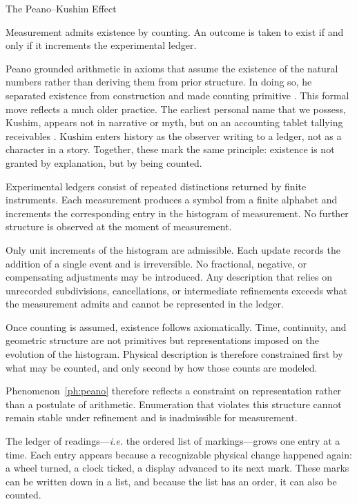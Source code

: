 \begin{phenom}{The Peano--Kushim Effect~\cite{peano1889,schmandtbesserat1992}}
\label{ph:peano}

\PhStatement
Measurement admits existence by counting.  An outcome is taken to exist if and
only if it increments the experimental ledger.

\PhOrigin
Peano grounded arithmetic in axioms that assume the existence of the natural
numbers rather than deriving them from prior structure. In doing so, he
separated existence from construction and made counting primitive
\cite{peano1889}. This formal move reflects a much older practice. The earliest
personal name that we possess, Kushim, appears not
in narrative or myth, but on an accounting tablet tallying receivables
\cite{schmandtbesserat1992}. Kushim enters history as the observer writing
to a ledger, not as a character in a story. Together, these mark the same
principle: existence is not granted by explanation, but by being counted.

\PhObservation
Experimental ledgers consist of repeated distinctions returned by finite
instruments.  Each  measurement produces a symbol from a finite
alphabet and increments the corresponding entry in the histogram of measurement.  
No further structure is observed at the moment of measurement.

\PhConstraint
Only unit increments of the histogram are admissible. Each update records the
addition of a single event and is irreversible. No fractional, negative, or
compensating adjustments may be introduced. Any description that relies on
unrecorded subdivisions, cancellations, or intermediate refinements exceeds
what the measurement admits and cannot be represented in the ledger.

\PhConsequence
Once counting is assumed, existence follows axiomatically.  Time, continuity,
and geometric structure are not primitives but representations imposed on the
evolution of the histogram.  Physical description is therefore constrained
first by what may be counted, and only second by how those counts are modeled.
\end{phenom}

Phenomenon~\ref{ph:peano} therefore reflects a constraint on representation rather than a
postulate of arithmetic.  Enumeration that violates this structure cannot remain
stable under refinement and is inadmissible for measurement.

The ledger of readings---\emph{i.e.} the ordered list of markings---grows one entry
at a time.  Each entry appears because a recognizable physical change happened
again: a wheel turned, a clock ticked, a display advanced to its next mark.  These
marks can be written down in a list, and because the list has an order, it can also
be counted.

